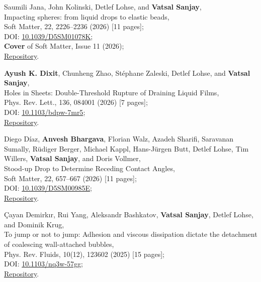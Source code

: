 \documentclass[10pt,a4paper,colorlinks,linkcolor=blue,urlcolor=blue,citecolor=blue]{moderncv}
\begin{document}
\begin{enumerate}[leftmargin=1.5em,label=\textbf{[\arabic*]}]
	\item Saumili Jana, John Kolinski, Detlef Lohse, and \textbf{Vatsal Sanjay},\\
	Impacting spheres: from liquid drops to elastic beads,\\
	Soft Matter, 22, 2226--2236 (2026) [11 pages];\\
	\faFile\hspace{0.2em}DOI: \href{https://doi.org/10.1039/D5SM01078K}{10.1039/D5SM01078K};\\
	\faStar\hspace{0.2em}\textbf{Cover} of Soft Matter, Issue 11 (2026);\\
	\faGithub\hspace{0.2em}\href{https://github.com/comphy-lab/Soft-Sphere-Impacts}{Repository}.

	\item \textbf{Ayush K. Dixit}, Chunheng Zhao, St\'ephane Zaleski, Detlef Lohse, and \textbf{Vatsal Sanjay},\\
	Holes in Sheets: Double-Threshold Rupture of Draining Liquid Films,\\
	Phys. Rev. Lett., 136, 084001 (2026) [7 pages];\\
	\faFile\hspace{0.2em}DOI: \href{https://doi.org/10.1103/bdpw-7mr5}{10.1103/bdpw-7mr5};\\
	\faGithub\hspace{0.2em}\href{https://github.com/comphy-lab/HoleySheet}{Repository}.

	\item Diego Díaz, \textbf{Anvesh Bhargava}, Florian Walz, Azadeh Sharifi, Saravanan Sumally, Rüdiger Berger, Michael Kappl, Hans-Jürgen Butt, Detlef Lohse, Tim Willers, \textbf{Vatsal Sanjay}, and Doris Vollmer,\\
	Stood-up Drop to Determine Receding Contact Angles,\\
	Soft Matter, 22, 657--667 (2026) [11 pages];\\
	\faFile\hspace{0.2em}DOI: \href{https://doi.org/10.1039/D5SM00985E}{10.1039/D5SM00985E};\\
	\faGithub\hspace{0.2em}\href{https://github.com/comphy-lab/Retracting-Droplet}{Repository}.

	\item Çayan Demirkır, Rui Yang, Aleksandr Bashkatov, \textbf{Vatsal Sanjay}, Detlef Lohse, and Dominik Krug,\\
	To jump or not to jump: Adhesion and viscous dissipation dictate the detachment of coalescing wall-attached bubbles,\\
	Phys. Rev. Fluids, 10(12), 123602 (2025) [15 pages];\\
	\faFile\hspace{0.2em}DOI: \href{https://doi.org/10.1103/nq3w-57gg}{10.1103/nq3w-57gg};\\
	\faGithub\hspace{0.2em}\href{https://github.com/VatsalSy/jumping-bubbles}{Repository}.


\end{enumerate}
\end{document}
